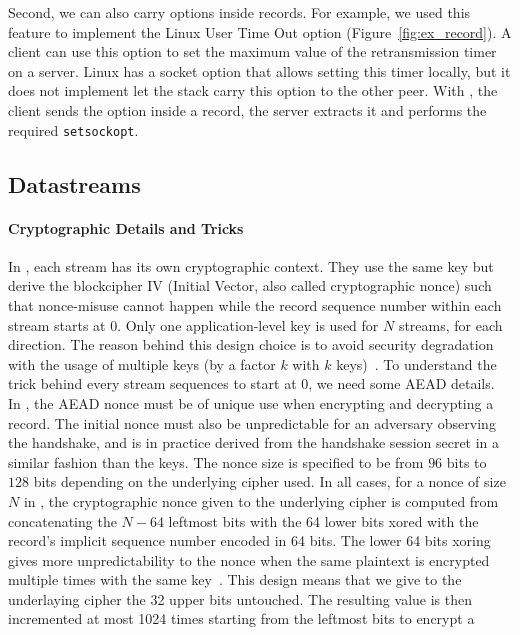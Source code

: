 Second, we can also carry \tcp options inside \tls records. For example, we used
this feature to implement the Linux \tcp User Time Out option
(Figure~\ref{fig:ex_record}). A client
can use this option to set the maximum value of the retransmission
timer on a server. Linux \tcp has a socket option that allows setting
this timer locally, but it does not implement let the stack carry this \tcp
option to the other peer. With \tcpls, the client sends the option inside a \tls
record, the server extracts it and performs the required \texttt{setsockopt}.

\subsection{Datastreams}
\label{sec:datastreams}

\paragraph*{Cryptographic Details and Tricks}
In \tcpls, each stream has its own cryptographic context. They use the same key
but derive the blockcipher IV (Initial Vector, also called cryptographic nonce)
such that nonce-misuse cannot happen while the record sequence number within
each stream starts at 0. Only one application-level key is used for $N$ streams,
for each direction.  The reason behind this design choice is to avoid security
degradation with the usage of multiple keys (by a factor $k$ with $k$
keys)~\cite{chatterjee2011another}. To understand the trick behind every
stream sequences to start at 0, we need some AEAD details. In \tcpls, the AEAD
nonce must be of unique use when encrypting and decrypting a record. The
initial nonce must also be unpredictable for an adversary observing the
handshake, and is in practice derived from the \tls handshake session secret in
a similar fashion than the \tls keys. The nonce size is specified to be from
$96$ bits to $128$ bits depending on the underlying cipher used. In all cases,
for a nonce of size $N$ in \tls, the cryptographic nonce given to the underlying
cipher is computed from concatenating the $N-64$ leftmost bits with the 64 lower
bits xored with the record's implicit sequence number encoded in 64 bits. The
lower 64 bits xoring gives more unpredictability to the nonce when the same
plaintext is encrypted multiple times with the same
key~\cite{bellare2016multi,hoang2018multi}. This design means that we give to
the underlaying cipher the 32 upper bits untouched. The resulting value is then
incremented at most 1024 times starting from the leftmost bits to encrypt a \tls
